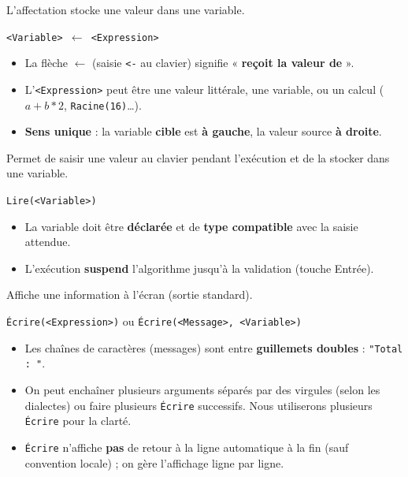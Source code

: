 \documentclass[11pt]{article}
\begin{document}
\begin{propriete}
L'affectation stocke une valeur dans une variable.
\begin{center}
\texttt{<Variable> $\leftarrow$ <Expression>}
\end{center}
\begin{itemize}
    \item La flèche $\leftarrow$ (saisie \texttt{<-} au clavier) signifie « \textbf{reçoit la valeur de} ».
    \item L'\texttt{<Expression>} peut être une valeur littérale, une variable, ou un calcul ($a + b * 2$, \texttt{Racine(16)}\ldots).
    \item \textbf{Sens unique} : la variable \textbf{cible} est \textbf{à gauche}, la valeur source \textbf{à droite}.
\end{itemize}
\end{propriete}

\begin{propriete}
Permet de saisir une valeur au clavier pendant l'exécution et de la stocker dans une variable.
\begin{center}
\texttt{Lire(<Variable>)}
\end{center}
\begin{itemize}
    \item La variable doit être \textbf{déclarée} et de \textbf{type compatible} avec la saisie attendue.
    \item L'exécution \textbf{suspend} l'algorithme jusqu'à la validation (touche Entrée).
\end{itemize}
\end{propriete}

\begin{propriete}
Affiche une information à l'écran (sortie standard).
\begin{center}
\texttt{Écrire(<Expression>)} \quad ou \quad \texttt{Écrire(<Message>, <Variable>)}
\end{center}
\begin{itemize}
    \item Les chaînes de caractères (messages) sont entre \textbf{guillemets doubles} : \texttt{"Total : "}.
    \item On peut enchaîner plusieurs arguments séparés par des virgules (selon les dialectes) ou faire plusieurs \texttt{Écrire} successifs. Nous utiliserons plusieurs \texttt{Écrire} pour la clarté.
    \item \texttt{Écrire} n'affiche \textbf{pas} de retour à la ligne automatique à la fin (sauf convention locale) ; on gère l'affichage ligne par ligne.
\end{itemize}
\end{propriete}
\end{document}
